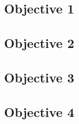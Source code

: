 \subsection{Objective 1}


\subsection{Objective 2}


\subsection{Objective 3}


\subsection{Objective 4}

